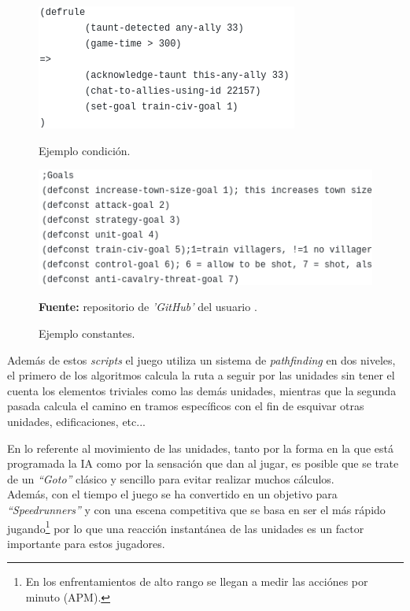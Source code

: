 \begin{figure}[ht]
\centering
\begin{minipage}[c]{0.45\linewidth}
	\hspace{9mm}
	\includegraphics[height=0.11\textheight]{imagenes/marco_teo/referentes/aoe_scripting_3.png}
	\caption{Ejemplo condición.}
	\label{img:aoe_script_3}
\end{minipage}
\begin{minipage}[c]{0.45\linewidth}
	\hspace{9mm}
	\includegraphics[height=0.11\textheight]{imagenes/marco_teo/referentes/aoe_scripting_4.png}
	\caption{Ejemplo constantes.}
	\label{img:aoe_script_4}
\end{minipage}
\textbf{Fuente:} repositorio de \textit{'GitHub'} del usuario \citeauthor*{Andygmb2014}. 
\label{img:aoe_scripting_2}	
\end{figure}

Además de estos \textit{scripts} el juego utiliza un sistema de \textit{pathfinding} en dos niveles,
el primero de los algoritmos calcula la ruta a seguir por las unidades sin tener el cuenta los
elementos triviales como las demás unidades, mientras que la segunda pasada calcula el camino 
en tramos específicos con el fin de esquivar otras unidades, edificaciones, etc...

En lo referente al movimiento de las unidades, tanto por la forma en la que está programada
la \ac{IA} como por la sensación que dan al jugar, es posible que se trate de un  \textit{``Goto''}
clásico y sencillo para evitar realizar muchos cálculos. \\
Además, con el tiempo el juego se ha convertido en un objetivo para \textit{``Speedrunners''}
y con una escena competitiva que se basa en ser el más rápido jugando\footnote{En los enfrentamientos de alto rango se llegan a medir las acciónes por minuto (APM).}
por lo que una reacción instantánea de las unidades es un factor importante para  estos
jugadores.

